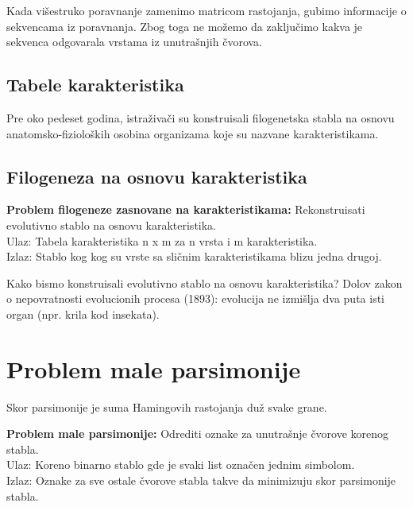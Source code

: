 Kada vi\v{s}estruko poravnanje zamenimo matricom rastojanja, gubimo informacije o sekvencama iz poravnanja. Zbog toga ne mo\v{z}emo da zaklju\v{c}imo kakva je sekvenca odgovarala vrstama iz unutra\v{s}njih \v{c}vorova.

\subsection{Tabele karakteristika}
\label{subsec:tk}

Pre oko pedeset godina, istra\v{z}iva\v{c}i su konstruisali filogenetska stabla na osnovu anatomsko-fiziolo\v{s}kih osobina organizama koje su nazvane karakteristikama.

\subsection{Filogeneza na osnovu karakteristika}
\label{subsec:fnok}

\begin{tcolorbox}
\textbf{Problem filogeneze zasnovane na karakteristikama:} Rekonstruisati evolutivno stablo na osnovu karakteristika. \\
Ulaz: Tabela karakteristika n x m za n vrsta i m karakteristika. \\
Izlaz: Stablo kog kog su vrste sa sli\v{c}nim karakteristikama blizu jedna drugoj. \\
\end{tcolorbox}

Kako bismo konstruisali evolutivno stablo na osnovu karakteristika?
Dolov zakon o nepovratnosti evolucionih procesa (1893): evolucija ne izmi\v{s}lja dva puta isti organ (npr. krila kod insekata).

\section{Problem male parsimonije}
\label{sec:pmp}

Skor parsimonije je suma Hamingovih rastojanja du\v{z} svake grane.

\begin{tcolorbox}
\textbf{Problem male parsimonije:} Odrediti oznake za unutra\v{s}nje \v{c}vorove korenog stabla. \\
Ulaz: Koreno binarno stablo gde je svaki list ozna\v{c}en jednim simbolom.\\
Izlaz: Oznake za sve ostale \v{c}vorove stabla takve da minimizuju skor parsimonije stabla.
\end{tcolorbox}

